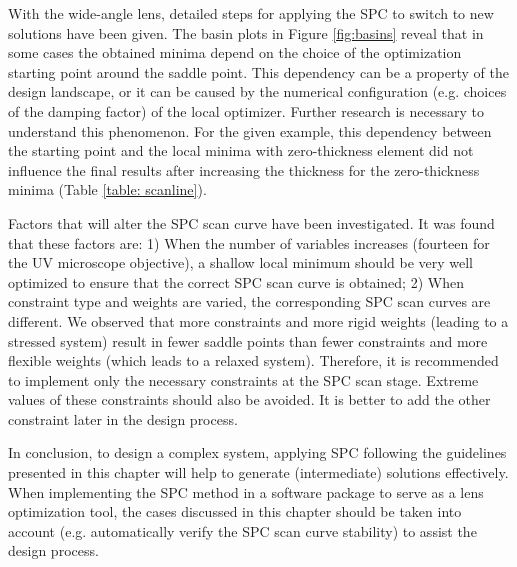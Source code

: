 With the wide-angle lens, detailed steps for applying the SPC to switch to new solutions have been given. The basin plots in Figure \ref{fig:basins} reveal that in some cases the obtained minima depend on the choice of the optimization starting point around the saddle point. This dependency can be a property of the design landscape, or it can be caused by the numerical configuration (e.g. choices of the damping factor) of the local optimizer. Further research is necessary to understand this phenomenon. For the given example, this dependency between the starting point and the local minima with zero-thickness element did not influence the final results after increasing the thickness for the zero-thickness minima (Table \ref{table: scanline}).

Factors that will alter the SPC scan curve have been investigated. It was found that these factors are: 1) When the number of variables increases (fourteen for the UV microscope objective), a shallow local minimum should be very well optimized to ensure that the correct SPC scan curve is obtained; 2) When constraint type and weights are varied, the corresponding SPC scan curves are different. We observed that more constraints and more rigid weights (leading to a stressed system) result in fewer saddle points than fewer constraints and more flexible weights (which leads to a relaxed system). Therefore, it is recommended to implement only the necessary constraints at the SPC scan stage. Extreme values of these constraints should also be avoided. It is better to add the other constraint later in the design process.

In conclusion, to design a complex system, applying SPC following the guidelines presented in this chapter will help to generate (intermediate) solutions effectively. When implementing the SPC method in a software package to serve as a lens optimization tool, the cases discussed in this chapter should be taken into account (e.g. automatically verify the SPC scan curve stability) to assist the design process.  



